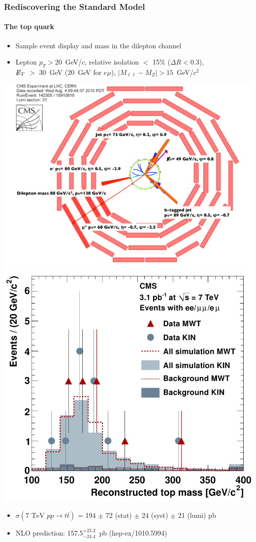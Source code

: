 \documentclass[compress]{beamer}
\begin{document}
\begin{frame}
\frametitle{Rediscovering the Standard Model}
\framesubtitle{The top quark}
\begin{itemize}
\item Sample event display and mass in the dilepton channel
\item Lepton $p_T > 20$~GeV/$c$, relative isolation $<$ 15\% ($\Delta R < 0.3$), \\ $\not\!\!{E_{T}}$ $>$ 30~GeV (20~GeV for $e\mu$), $|M_{\ell\ell} - M_Z| > 15$~GeV/$c^2$
\end{itemize}
\includegraphics[width=0.55\linewidth]{top_e-mu_event.png}
\includegraphics[width=0.45\linewidth]{newtop_mass.png}
\begin{itemize}
\item $\sigma(7\mbox{ TeV }pp \to t\bar{t})$ = 194 $\pm$ 72 (stat) $\pm$ 24 (syst) $\pm$ 21 (lumi) pb
\item NLO prediction: 157.5$^{+23.2}_{-24.4}$~pb \hfill (hep-ex/1010.5994)
\end{itemize}
\end{frame}
\end{document}
